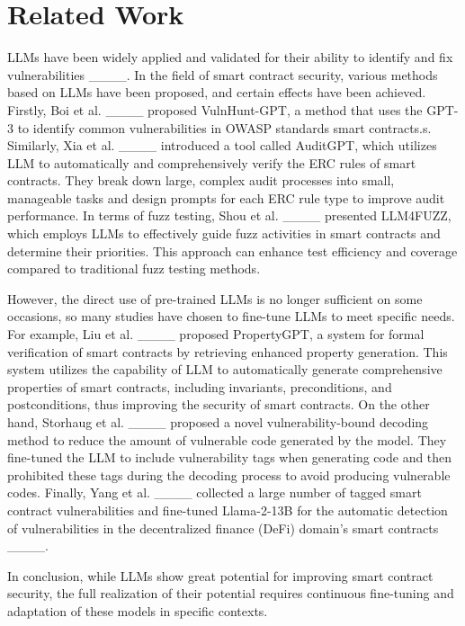 \section{Related Work}
LLMs have been widely applied and validated for their ability to identify and fix vulnerabilities ____. In the field of smart contract security, various methods based on LLMs have been proposed, and certain effects have been achieved.
Firstly, Boi et al. ____ proposed VulnHunt-GPT, a method that uses the GPT-3 to identify common vulnerabilities in OWASP standards smart contracts.s. Similarly, Xia et al. ____ introduced a tool called AuditGPT, which utilizes LLM to automatically and comprehensively verify the ERC rules of smart contracts. They break down large, complex audit processes into small, manageable tasks and design prompts for each ERC rule type to improve audit performance. 
In terms of fuzz testing, Shou et al. ____ presented LLM4FUZZ, which employs LLMs to effectively guide fuzz activities in smart contracts and determine their priorities. This approach can enhance test efficiency and coverage compared to traditional fuzz testing methods.

However, the direct use of pre-trained LLMs is no longer sufficient on some occasions, so many studies have chosen to fine-tune LLMs to meet specific needs. For example, Liu et al. ____ proposed PropertyGPT,  a system for formal verification of smart contracts by retrieving enhanced property generation. This system utilizes the capability of LLM to automatically generate comprehensive properties of smart contracts, including invariants, preconditions, and postconditions, thus improving the security of smart contracts. On the other hand, Storhaug et al. ____ proposed a novel vulnerability-bound decoding method to reduce the amount of vulnerable code generated by the model. They fine-tuned the LLM to include vulnerability tags when generating code and then prohibited these tags during the decoding process to avoid producing vulnerable codes. Finally, Yang et al. ____ collected a large number of tagged smart contract vulnerabilities and fine-tuned Llama-2-13B for the automatic detection of vulnerabilities in the decentralized finance (DeFi) domain's smart contracts ____.

In conclusion, while LLMs show great potential for improving smart contract security, the full realization of their potential requires continuous fine-tuning and adaptation of these models in specific contexts.